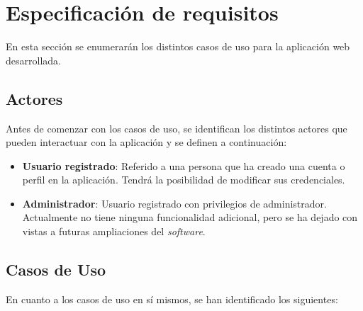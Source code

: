 \section{Especificación de requisitos}
\label{sec:Especificación de requisitos}

En esta sección se enumerarán los distintos casos de uso para la aplicación web desarrollada.

\subsection{Actores}
Antes de comenzar con los casos de uso, se identifican los distintos actores que pueden interactuar con la aplicación y se definen a continuación:
\begin{itemize}
    \item \textbf{Usuario registrado}: Referido a una persona que ha creado una cuenta o perfil en la aplicación. Tendrá la posibilidad de modificar sus credenciales.
    \item \textbf{Administrador}: Usuario registrado con privilegios de administrador. Actualmente no tiene ninguna funcionalidad adicional, pero se ha dejado con vistas a futuras ampliaciones del \textit{software}.
\end{itemize}

\subsection{Casos de Uso}
En cuanto a los casos de uso en sí mismos, se han identificado los siguientes:

